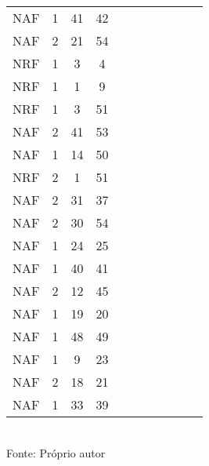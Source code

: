 \begin{table}[H]
{\begin{tabular}{ccccccccccc}
NAF & 1 & 41 & 42 &  &  &  &  &  &  &  \\
NAF & 2 & 21 & 54 &  &  &  &  &  &  &  \\
NRF & 1 & 3 & 4 &  &  &  &  &  &  &  \\
NRF & 1 & 1 & 9 &  &  &  &  &  &  &  \\
NRF & 1 & 3 & 51 &  &  &  &  &  &  &  \\
NAF & 2 & 41 & 53 &  &  &  &  &  &  &  \\
NAF & 1 & 14 & 50 &  &  &  &  &  &  &  \\
NRF & 2 & 1 & 51 &  &  &  &  &  &  &  \\
NAF & 2 & 31 & 37 &  &  &  &  &  &  &  \\
NAF & 2 & 30 & 54 &  &  &  &  &  &  &  \\
NAF & 1 & 24 & 25 &  &  &  &  &  &  &  \\
NAF & 1 & 40 & 41 &  &  &  &  &  &  &  \\
NAF & 2 & 12 & 45 &  &  &  &  &  &  &  \\
NAF & 1 & 19 & 20 &  &  &  &  &  &  &  \\
NAF & 1 & 48 & 49 &  &  &  &  &  &  &  \\
NAF & 1 & 9 & 23 &  &  &  &  &  &  &  \\
NAF & 2 & 18 & 21 &  &  &  &  &  &  &  \\
NAF & 1 & 33 & 39 &  &  &  &  &  &  &  \\
\bottomrule
\end{tabular}}
\\Fonte: Próprio autor
\end{table}


